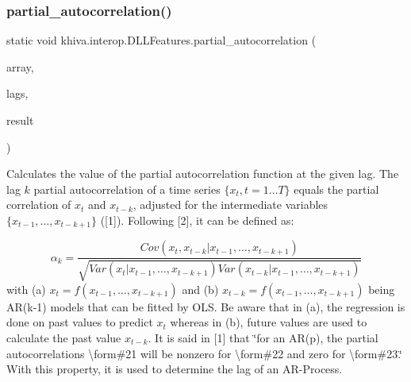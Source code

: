 \subsubsection{\texorpdfstring{partial\+\_\+autocorrelation()}{partial\_autocorrelation()}}
{\footnotesize\ttfamily static void khiva.\+interop.\+D\+L\+L\+Features.\+partial\+\_\+autocorrelation (\begin{DoxyParamCaption}\item[{\mbox{[}\+In\mbox{]} ref Int\+Ptr}]{array,  }\item[{\mbox{[}\+In\mbox{]} ref Int\+Ptr}]{lags,  }\item[{\mbox{[}\+Out\mbox{]} out Int\+Ptr}]{result }\end{DoxyParamCaption})\hspace{0.3cm}{\ttfamily [static]}}



Calculates the value of the partial autocorrelation function at the given lag. The lag $k$ partial autocorrelation of a time series $\lbrace x_t, t = 1 \ldots T \rbrace$ equals the partial correlation of $x_t$ and $x_{t-k}$, adjusted for the intermediate variables $\lbrace x_{t-1}, \ldots, x_{t-k+1} \rbrace$ (\mbox{[}1\mbox{]}). Following \mbox{[}2\mbox{]}, it can be defined as\+: 

\[ \alpha_k = \frac{ Cov(x_t, x_{t-k} | x_{t-1}, \ldots, x_{t-k+1})} {\sqrt{ Var(x_t | x_{t-1}, \ldots, x_{t-k+1}) Var(x_{t-k} | x_{t-1}, \ldots, x_{t-k+1} )}} \] with (a) $x_t = f(x_{t-1}, \ldots, x_{t-k+1})$ and (b) $ x_{t-k} = f(x_{t-1}, \ldots, x_{t-k+1})$ being AR(k-\/1) models that can be fitted by O\+LS. Be aware that in (a), the regression is done on past values to predict $ x_t $ whereas in (b), future values are used to calculate the past value $x_{t-k}$. It is said in \mbox{[}1\mbox{]} that \char`\"{}for an A\+R(p), the partial autocorrelations \textbackslash{}form\#21 will be nonzero for \textbackslash{}form\#22
and zero for \textbackslash{}form\#23.\char`\"{} With this property, it is used to determine the lag of an A\+R-\/\+Process.

